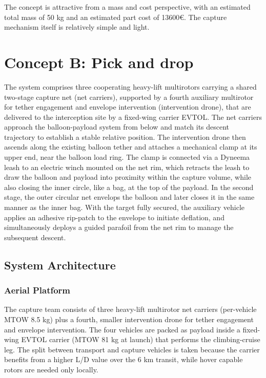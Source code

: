 The concept is attractive from a mass and cost perspective, with an estimated total mass of 50 kg and an estimated part cost of 13600€. The capture mechanism itself is relatively simple and light.

\section{Concept B: Pick and drop}

The system comprises three cooperating heavy-lift multirotors carrying a shared two-stage capture net (net carriers), supported by a fourth auxiliary multirotor for tether engagement and envelope intervention (intervention drone), that are delivered to the interception site by a fixed-wing carrier EVTOL. The net carriers approach the balloon-payload system from below and match its descent trajectory to establish a stable relative position. The intervention drone then ascends along the existing balloon tether and attaches a mechanical clamp at its upper end, near the balloon load ring. The clamp is connected via a Dyneema leash to an electric winch mounted on the net rim, which retracts the leash to draw the balloon and payload into proximity within the capture volume, while also closing the inner circle, like a bag, at the top of the payload. In the second stage, the outer circular net envelops the balloon and later closes it in the same manner as the inner bag. With the target fully secured, the auxiliary vehicle applies an adhesive rip-patch to the envelope to initiate  deflation, and simultaneously deploys a guided parafoil from the net rim to manage the subsequent descent.

\subsection{System Architecture}
\label{subsec:concept_B_architecture}

\subsubsection{Aerial Platform}
The capture team consists of three heavy-lift multirotor net carriers (per-vehicle MTOW 8.5 kg) plus a fourth, smaller intervention drone for tether engagement and envelope intervention. The four vehicles are packed as payload inside a fixed-wing EVTOL carrier (MTOW 81 kg at launch) that performs the climbing-cruise leg. The split between transport and capture vehicles is taken because the carrier benefits from a higher L/D value over the 6 km transit, while hover capable rotors are needed only locally.


